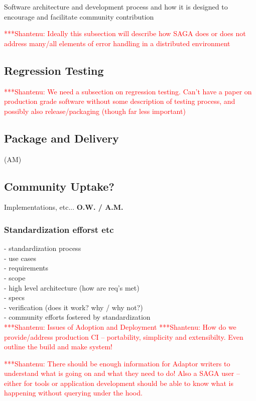 \documentclass[a4paper,10pt]{article}
\newcommand{\jhanote}[1]{  {\textcolor{red}     { ***Shantenu: #1 }}}
\newcommand{\jhanote}[1]{}
\begin{document}
  Software architecture and development process and how it is designed to
  encourage and facilitate community contribution
    
  \jhanote{Ideally this subsection will describe how SAGA does or does not
  address many/all elements of error handling in a distributed environment}

  \subsection{Regression Testing} \jhanote{We need a subsection on regression
  testing. Can't have a paper on production grade software without some
  description of testing process, and possibly also release/packaging (though
  far less important)}
  
  \subsection{Package and Delivery} (AM)



 \subsection{Community Uptake?}

   Implementations, etc... \textbf{O.W. / A.M.}

   \subsubsection{Standardization efforst etc}

    - standardization process\\
      - use cases\\
      - requirements\\
      - scope\\
      - high level architecture (how are req's met)\\
      - specs\\
      - verification (does it work?  why / why not?)\\
    - community efforts fostered by standardization\\


 \jhanote{Issues of Adoption and Deployment} \jhanote{How do we
   provide/address production CI -- portability, simplicity and
   extensibilty. Even outline the build and make system!}

 \jhanote{There should be enough information for Adaptor writers to
   understand what is going on and what they need to do! Also a SAGA
   user -- either for tools or application development should be able
   to know what is happening without querying under the hood.}
   
\end{document}
